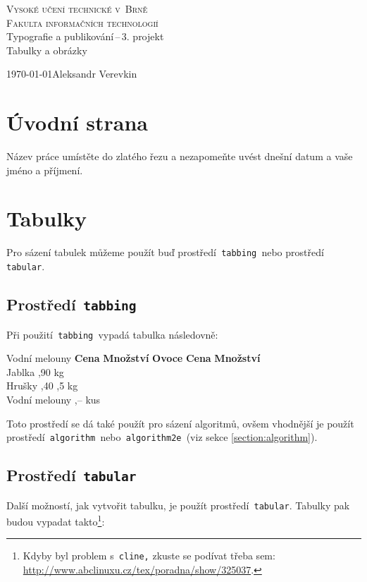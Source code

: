 \documentclass[a4paper, 11pt]{article}
\begin{document}
\begin{titlepage}

\begin{center}
\Huge
\textsc{Vysoké učení technické v~Brně}\\
\huge
\textsc{Fakulta informačních technologií}\\
\LARGE
Typografie a publikování\,--\,3. projekt\\
\Huge
Tabulky a obrázky\\
\end{center}
{\Large \today \hfill Aleksandr Verevkin}

\end{titlepage}

\section{Úvodní strana}
Název práce umístěte do zlatého řezu a nezapomeňte uvést dnešní datum a vaše jméno a příjmení.
\section{Tabulky}
Pro sázení tabulek můžeme použít buď prostředí\texttt{ tabbing }nebo prostředí\texttt{ tabular}.
\subsection{Prostředí\texttt{ tabbing }}

Při použití\texttt{ tabbing }vypadá tabulka následovně:
\begin{tabbing}
  Vodní melouny \quad \=\textbf{Cena} \quad \= \textbf{Množství} \kill
  \textbf{Ovoce}\> \textbf{Cena}\> \textbf{Množství} \\
  Jablka ,90  kg \\
  Hrušky ,40 ,5 kg \\
  Vodní melouny ,--  kus
\end{tabbing}

\bigskip

\noindent Toto prostředí se dá také použít pro sázení algoritmů, ovšem vhodnější je použít 
prostředí\texttt{ algorithm }nebo\texttt{ algorithm2e }(viz sekce \ref{section:algorithm}).
\subsection{Prostředí\texttt{ tabular }}
Další možností, jak vytvořit tabulku, je použít prostředí\texttt{ tabular}. Tabulky pak 
budou vypadat takto\footnote{Kdyby byl problem s\texttt{ cline,} zkuste se podívat třeba sem: 
\href{http://www.abclinuxu.cz/tex/poradna/show/325037}{http://www.abclinuxu.cz/tex/poradna/show/325037}.}:
\end{document}

